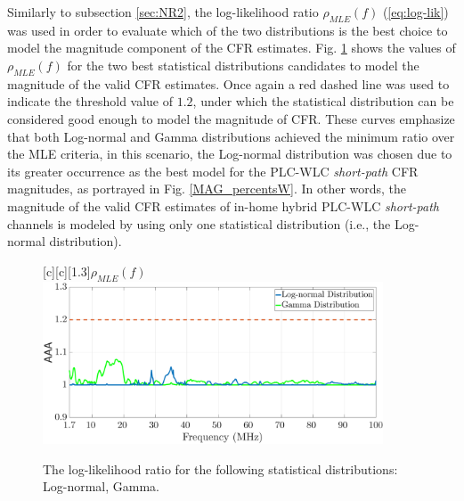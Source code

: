 Similarly to subsection \ref{sec:NR2}, the log-likelihood ratio $\rho_{MLE} (f)$ (\ref{eq:log-lik}) was used in order to evaluate which of the two distributions is the best choice to model the magnitude component of the \ac{CFR} estimates. Fig. \ref{fig:Log_likesW} shows the values of  $\rho_{MLE}(f)$ for the two best statistical distributions candidates to model the magnitude of the valid \ac{CFR} estimates. Once again a red dashed line was used to indicate the threshold value of $1.2$, under which the statistical distribution can be considered good enough to model the magnitude of \ac{CFR}. These curves emphasize that both Log-normal and Gamma distributions achieved the minimum ratio over the \ac{MLE} criteria, in this scenario, the Log-normal distribution was chosen due to its greater occurrence as the best model for the \ac{PLC}-\ac{WLC} \textit{short-path} \ac{CFR} magnitudes, as portrayed in Fig. \ref{MAG_percentsW}. In other words, the magnitude of the valid \ac{CFR} estimates of in-home hybrid \ac{PLC}-\ac{WLC} \textit{short-path} channels is modeled by using only one statistical distribution (i.e., the Log-normal distribution).


\begin{figure}[h!]
	\centering
	[c][1.3]{$\rho_{MLE} (f)$}
	\includegraphics[width=0.9\textwidth]{images/Log_Lognormal_GammasW.eps}
	\caption{The log-likelihood ratio for the following statistical distributions: Log-normal, Gamma.}
	\label{fig:Log_likesW}
\end{figure}


